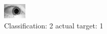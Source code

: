 \begin{figure}[h!]
\begin{center}
\includegraphics[width=0.60\columnwidth]{figures/ID1585_class_2_target_1.png}
\end{center}
\caption{ Classification: 2 actual target: 1}
\label{fig:ID1585_class_2_target_1}
\end{figure}
